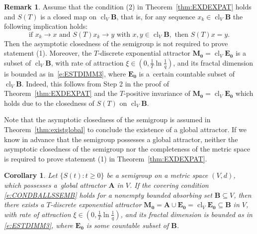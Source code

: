 \documentclass[a4paper,12pt,reqno]{amsart}
\theoremstyle{plain}
\newtheorem{cor}[lem]{Corollary}
\theoremstyle{definition}
\newtheorem{rem}[lem]{Remark}
\numberwithin{equation}{section}
\newcommand{\cl}{\operatorname{cl}}
\renewcommand{\geq}{\geqslant}
\begin{document}
\begin{rem}\label{rem:closed}
Assume that the condition (2) in Theorem~\ref{thm:EXDEXPAT} holds and $S(T)$ is a closed map on $\cl_{V}\mathbf{B}$, that is,
for any sequence $x_k\in\cl_{V}\mathbf{B}$ the following implication holds:
$$\text{if }x_k\to x\text{ and }S(T)x_k\to y\text{ with }x,y\in\cl_{V}\mathbf{B},\text{ then }S(T)x=y.$$   
Then the asymptotic closedness of the semigroup is not required to prove statement (1). Moreover, the $T$-discrete exponential attractor $\mathbf{M_0}=\cl_{V}\mathbf{E_0}$ 
is a subset of $\cl_{V}\mathbf{B}$, with rate of attraction $\xi\in(0,\frac{1}{T}\ln\frac{1}{q})$, and
its fractal dimension is bounded as in~\eqref{e:ESTDIMM3}, where $\mathbf{E_0}$ is a~certain countable subset of $\cl_{V}\mathbf{B}$.
Indeed, this follows from Step 2 in the proof of Theorem~\ref{thm:EXDEXPAT} and the $T$-positive invariance of  $\mathbf{M_0}=\cl_{V}\mathbf{E_0}$ which holds due to the closedness of $S(T)$ on $\cl_{V}\mathbf{B}$. 
\end{rem}

Note that the asymptotic closedness of the semigroup is assumed in Theorem~\ref{thm:existglobal} to conclude the existence of a global attractor. If we know in advance that the semigroup possesses a global attractor, neither the asymptotic closedness of the semigroup nor the completeness of the metric space is required to prove statement (1) in Theorem~\ref{thm:EXDEXPAT}.

\begin{cor}\label{cor:WITHGLOBALATTR}
Let $\{S(t)\colon t\geq 0\}$ be a semigroup on a metric space $(V,d)$, which possesses a~global attractor $\mathbf{A}$ in $V$.
If the covering condition \eqref{e:CONDBALLSSEMB} holds for a nonempty bounded 
absorbing set $\mathbf{B}\subseteq V$, then there exists a $T$-discrete exponential attractor $\mathbf{M_0}=\mathbf{A}\cup\mathbf{E_0}=\cl_{V}\mathbf{E_0}\subseteq\mathbf{B}$ in $V$, with rate of attraction $\xi\in(0,\frac{1}{T}\ln\frac{1}{q})$, and its fractal dimension is bounded as in \eqref{e:ESTDIMM3}, where $\mathbf{E_0}$ is some countable subset of $\mathbf{B}$.
\end{cor}
\end{document}
